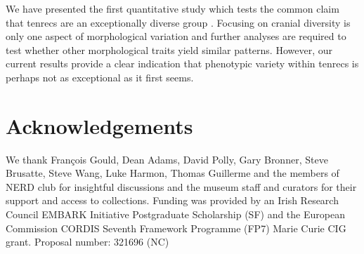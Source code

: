 \documentclass[12pt,a4paper]{article}
\begin{document}
  

	
	We have presented the first quantitative study which tests the common claim that tenrecs are an exceptionally diverse group \citep{Olson2013, Soarimalala2011,Eisenberg1969}. Focusing on cranial diversity is only one aspect of morphological variation and further analyses are required to test whether other morphological traits yield similar patterns. However, our current results provide a clear indication that phenotypic variety within tenrecs is perhaps not as exceptional as it first seems.
	
\section*{Acknowledgements}

	We thank Fran\c{c}ois Gould, Dean Adams, David Polly, Gary Bronner, Steve Brusatte, Steve Wang, Luke Harmon, Thomas Guillerme and the members of NERD club for insightful discussions and the museum %
	staff and curators for their support and access to collections. Funding was provided by an Irish Research Council EMBARK Initiative Postgraduate Scholarship (SF) and the European Commission CORDIS Seventh Framework Programme (FP7) Marie Curie CIG grant. Proposal number: 321696 (NC)





\end{document}
